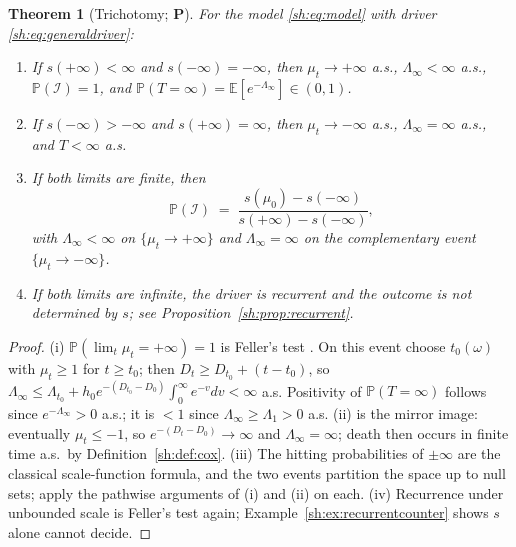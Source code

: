 \documentclass[11pt]{article}
\numberwithin{equation}{section}
\theoremstyle{plain}
\newtheorem{theorem}{Theorem}[section]
\theoremstyle{definition}
\theoremstyle{remark}
\newcommand{\E}{\mathbb{E}}
\newcommand{\PP}{\mathbb{P}}
\newcommand{\Imm}{\mathcal{I}}
\begin{document}
\begin{theorem}[Trichotomy; \textbf{P}]\label{sh:thm:trichotomy}
For the model \eqref{sh:eq:model} with driver
\eqref{sh:eq:generaldriver}:
\begin{enumerate}[label=\emph{(\roman*)},itemsep=1pt]
\item If $s(+\infty)<\infty$ and $s(-\infty)=-\infty$, then
$\mu_t\to+\infty$ a.s., $\Lambda_\infty<\infty$ a.s., $\PP(\Imm)=1$, and
$\PP(T=\infty)=\E[e^{-\Lambda_\infty}]\in(0,1)$.
\item If $s(-\infty)>-\infty$ and $s(+\infty)=\infty$, then
$\mu_t\to-\infty$ a.s., $\Lambda_\infty=\infty$ a.s., and $T<\infty$ a.s.
\item If both limits are finite, then
\begin{equation}\label{sh:eq:scaleformula}
\PP(\Imm)\;=\;\frac{s(\mu_0)-s(-\infty)}{s(+\infty)-s(-\infty)},
\end{equation}
with $\Lambda_\infty<\infty$ on $\{\mu_t\to+\infty\}$ and
$\Lambda_\infty=\infty$ on the complementary event
$\{\mu_t\to-\infty\}$.
\item If both limits are infinite, the driver is recurrent and the outcome
is \emph{not} determined by $s$; see
Proposition~\ref{sh:prop:recurrent}.
\end{enumerate}
\end{theorem}

\begin{proof}
(i) $\PP(\lim_t\mu_t=+\infty)=1$ is Feller's test \cite{KT81}. On this
event choose $t_0(\omega)$ with $\mu_t\ge1$ for $t\ge t_0$; then
$D_t\ge D_{t_0}+(t-t_0)$, so
$\Lambda_\infty\le\Lambda_{t_0}+h_0e^{-(D_{t_0}-D_0)}\int_0^\infty
e^{-v}dv<\infty$ a.s. Positivity of $\PP(T=\infty)$ follows since
$e^{-\Lambda_\infty}>0$ a.s.; it is $<1$ since $\Lambda_\infty\ge
\Lambda_1>0$ a.s. (ii) is the mirror image: eventually $\mu_t\le-1$, so
$e^{-(D_t-D_0)}\to\infty$ and $\Lambda_\infty=\infty$; death then occurs in
finite time a.s.\ by Definition~\ref{sh:def:cox}. (iii) The hitting
probabilities of $\pm\infty$ are the classical scale-function formula, and
the two events partition the space up to null sets; apply the pathwise
arguments of (i) and (ii) on each. (iv) Recurrence under unbounded scale is
Feller's test again; Example~\ref{sh:ex:recurrentcounter} shows $s$ alone
cannot decide.
\end{proof}
\end{document}
